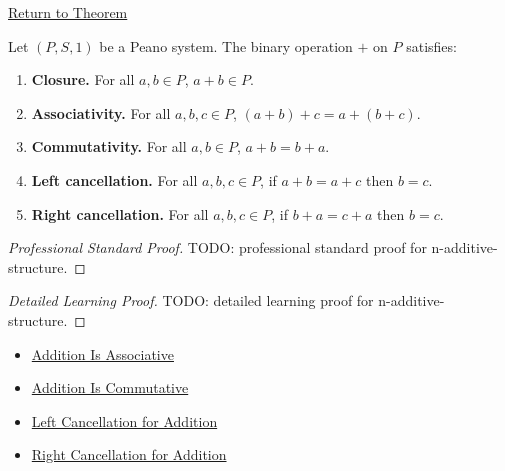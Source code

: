 \newpage
{}
\label{prf:n-additive-structure}

\begin{remark*}[Return]
\hyperref[thm:n-additive-structure]{Return to Theorem}
\end{remark*}

\begin{theorem*}
Let $(P,S,1)$ be a Peano system. The binary operation $+$ on $P$ satisfies:
\begin{enumerate}
  \item \textbf{Closure.} For all $a,b \in P$, $a+b \in P$.
  \item \textbf{Associativity.} For all $a,b,c \in P$,
  $(a+b)+c = a+(b+c)$.
  \item \textbf{Commutativity.} For all $a,b \in P$, $a+b = b+a$.
  \item \textbf{Left cancellation.} For all $a,b,c \in P$, if $a+b = a+c$ then $b=c$.
  \item \textbf{Right cancellation.} For all $a,b,c \in P$, if $b+a = c+a$ then $b=c$.
\end{enumerate}
\end{theorem*}

\begin{proof}[Professional Standard Proof]
\LRAProofBodyStart
TODO: professional standard proof for n-additive-structure.
\end{proof}

\begin{proof}[Detailed Learning Proof]
\LRAProofBodyStart
TODO: detailed learning proof for n-additive-structure.
\end{proof}

\begin{remark*}
\end{remark*}

\begin{dependencies}
\begin{itemize}
  \item \hyperref[thm:addition-associative]{Addition Is Associative}
  \item \hyperref[thm:addition-commutative]{Addition Is Commutative}
  \item \hyperref[thm:addition-left-cancellation]{Left Cancellation for Addition}
  \item \hyperref[thm:addition-right-cancellation]{Right Cancellation for Addition}
\end{itemize}
\end{dependencies}

\clearpage
